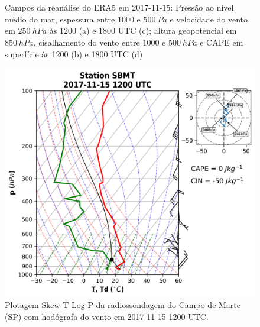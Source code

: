 \begin{figure}[htb]
	\begin{center}
		\caption{Campos da reanálise do ERA5 em 2017-11-15: Pressão ao nível médio do mar, espessura entre $1000$ e $500\:Pa$ e velocidade do vento em $250\:hPa$ às 1200 (a) e 1800 UTC (c); altura geopotencial em $850\:hPa$, cisalhamento do vento entre $1000$ e $500\:hPa$ e CAPE em superfície às 1200 (b) e 1800 UTC (d)} 
		\label{era5_20171115_main}
		 \\
		 \\
	\end{center}
\end{figure}

\begin{figure}[htb]
	\begin{center}
		\caption{Plotagem Skew-T Log-P da radiossondagem do Campo de Marte (SP) com hodógrafa do vento em 2017-11-15 1200 UTC.} 
		\label{sondagem_20171115}
		\includegraphics[width=0.9\columnwidth]{../Sounding_Processing/figures/sounding_SBMT2017111512UTC.png}
	\end{center}
\end{figure}

